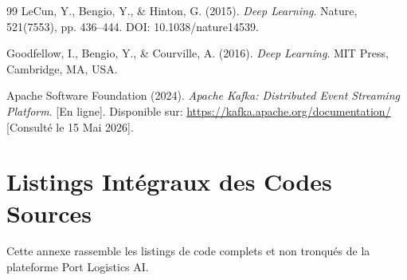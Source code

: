 \documentclass[12pt,a4paper]{article}
\begin{document}
\begin{thebibliography}{99}
LeCun, Y., Bengio, Y., \& Hinton, G. (2015).
\textit{Deep Learning}.
Nature, 521(7553), pp. 436--444. DOI: 10.1038/nature14539.

Goodfellow, I., Bengio, Y., \& Courville, A. (2016).
\textit{Deep Learning}.
MIT Press, Cambridge, MA, USA.

Apache Software Foundation (2024).
\textit{Apache Kafka: Distributed Event Streaming Platform}.
[En ligne]. Disponible sur: \url{https://kafka.apache.org/documentation/} [Consulté le 15 Mai 2026].

\end{thebibliography}

\newpage

\appendix
\section{Listings Intégraux des Codes Sources}
\label{annexe:code}

Cette annexe rassemble les listings de code complets et non tronqués de la plateforme Port Logistics AI.
\end{document}
